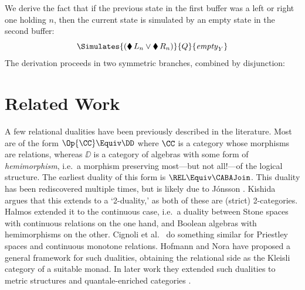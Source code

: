 \documentclass[a4paper,UKenglish,cleveref, autoref]{lipics-v2021}
\begin{document}
We derive the fact that if the previous state in the first buffer was a left or right one holding $n$, then the current state is simulated by an empty state in the second buffer:
\[
  \Simulates{(\blacklozenge\, L_n \lor \blacklozenge\, R_n)}{Q}{\mathit{empty}_Y}
\]
The derivation proceeds in two symmetric branches, combined by disjunction:
\begin{mathpar}
\end{mathpar}

\section{Related Work}\label{section:related-work}

A few relational dualities have been previously described in the literature.
Most are of the form $\Op{\CC} \Equiv \DD$ where $\CC$ is a category whose
morphisms are relations, whereas $\DD$ is a category of algebras with some form
of \emph{hemimorphism}, i.e.\ a morphism preserving most---but not all!---of
the logical structure. The earliest duality of this form is $\REL \Equiv \CABAJoin$.
This duality has been rediscovered multiple times, but is likely due to
J\'{o}nsson \cite{jonsson_1951}. Kishida \cite[\S 2.3]{kishida_2018} argues that
this extends to a `2-duality,' as both of these are (strict) 2-categories.
Halmos \cite{halmos_1956} extended it to the continuous case, i.e.\ a duality
between Stone spaces with continuous relations on the one hand, and Boolean
algebras with hemimorphisms on the other. Cignoli et al.\ \cite{cignoli_1991} do
something similar for Priestley spaces and continuous monotone relations. Hofmann
and Nora \cite{hofmann_2015} have proposed a general framework for such
dualities, obtaining the relational side as the Kleisli category of a suitable
monad. In later work they extended such dualities to metric structures and
quantale-enriched categories \cite{hofmann_2023}.
\end{document}
